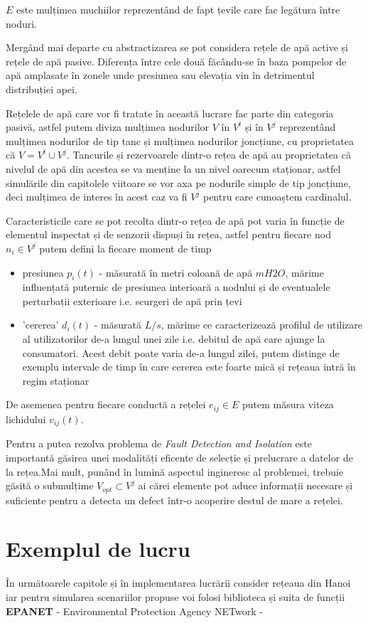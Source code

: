 $E$ este mulțimea muchiilor reprezentând de fapt țevile care fac legătura între noduri.

Mergând mai departe cu abstractizarea se pot considera rețele de apă active și rețele de apă pasive. Diferența între cele două făcându-se în baza pompelor de apă amplasate în zonele unde presiunea sau elevația vin în detrimentul distribuției apei.

Rețelele de apă care vor fi tratate în această lucrare fac parte din categoria pasivă, astfel putem diviza mulțimea nodurilor $V$ în $V^t$ și în $V^j$ reprezentând mulțimea nodurilor de tip tanc și mulțimea nodurilor joncțiune, cu proprietatea că $V = V^t \cup V^j$. Tancurile și rezervoarele dintr-o rețea de apă au proprietatea că nivelul de apă din acestea se va menține la un nivel oarecum staționar, astfel simulările din capitolele viitoare se vor axa pe nodurile simple de tip joncțiune, deci mulțimea de interes în acest caz va fi $V^j$ pentru care cunoaștem cardinalul.

Caracteristicile care se pot recolta dintr-o rețea de apă pot varia în funcție de elementul inspectat și de senzorii dispuși în rețea, astfel pentru fiecare nod $n_i \in V^j$ putem defini la fiecare moment de timp 
\begin{itemize}
\item presiunea $p_i(t)$ - măsurată în metri coloană de apă $mH2O$, mărime influențată puternic de presiunea interioară a nodului și de eventualele perturbații exterioare i.e. scurgeri de apă prin țevi
\item 'cererea' $d_i(t)$ - măsurată $L/s$, mărime ce caracterizează profilul de utilizare al utilizatorilor de-a lungul unei zile i.e. debitul de apă care ajunge la consumatori. Acest debit poate varia de-a lungul zilei, putem distinge de exemplu intervale de timp în care cererea este foarte mică și rețeaua intră în regim staționar
\end{itemize}

De asemenea pentru fiecare conductă a rețelei $e_{ij} \in E$ putem măsura viteza lichidului $v_{ij}(t)$.

Pentru a putea rezolva problema de \textit{Fault Detection and Isolation} este importantă găsirea unei modalități eficente de selecție și prelucrare a datelor de la rețea.Mai mult, punând în lumină aspectul ingineresc al problemei, trebuie găsită o submulțime $V_{opt} \subset V^j$ ai cărei elemente pot aduce informații necesare și suficiente pentru a detecta un defect într-o acoperire destul de mare a rețelei.
\pagebreak
\section{Exemplul de lucru}
În următoarele capitole și în implementarea lucrării consider rețeaua din Hanoi iar pentru simularea scenariilor propuse voi folosi biblioteca și suita de funcții \textbf{EPANET} - Environmental Protection Agency NETwork - \cite{rossman2000epanet}


